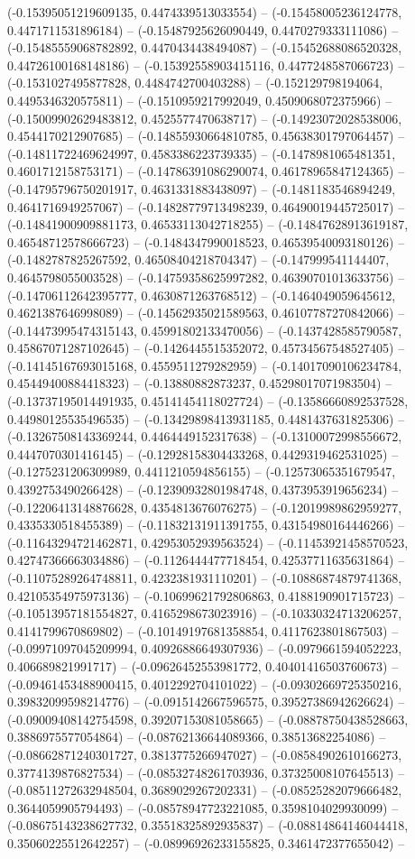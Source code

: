 (-0.15395051219609135, 0.4474339513033554) -- (-0.15458005236124778, 0.4471711531896184) -- (-0.15487925626090449, 0.4470279333111086) -- (-0.15485559068782892, 0.4470434438494087) -- (-0.15452688086520328, 0.44726100168148186) -- (-0.15392558903415116, 0.4477248587066723) -- (-0.1531027495877828, 0.4484742700403288) -- (-0.152129798194064, 0.4495346320575811) -- (-0.1510959217992049, 0.4509068072375966) -- (-0.15009902629483812, 0.4525577470638717) -- (-0.14923072028538006, 0.4544170212907685) -- (-0.14855930664810785, 0.45638301797064457) -- (-0.14811722469624997, 0.4583386223739335) -- (-0.1478981065481351, 0.4601712158753171) -- (-0.14786391086290074, 0.46178965847124365) -- (-0.14795796750201917, 0.4631331883438097) -- (-0.1481183546894249, 0.4641716949257067) -- (-0.14828779713498239, 0.46490019445725017) -- (-0.14841900909881173, 0.46533113042718255) -- (-0.14847628913619187, 0.46548712578666723) -- (-0.1484347990018523, 0.46539540093180126) -- (-0.1482787825267592, 0.46508404218704347) -- (-0.147999541144407, 0.4645798055003528) -- (-0.14759358625997282, 0.46390701013633756) -- (-0.14706112642395777, 0.4630871263768512) -- (-0.1464049059645612, 0.4621387646998089) -- (-0.14562935021589563, 0.46107787270842066) -- (-0.14473995474315143, 0.45991802133470056) -- (-0.1437428585790587, 0.45867071287102645) -- (-0.1426445515352072, 0.45734567548527405) -- (-0.14145167693015168, 0.4559511279282959) -- (-0.14017090106234784, 0.45449400884418323) -- (-0.13880882873237, 0.45298017071983504) -- (-0.13737195014491935, 0.45141454118027724) -- (-0.13586660892537528, 0.44980125535496535) -- (-0.13429898413931185, 0.4481437631825306) -- (-0.13267508143369244, 0.4464449152317638) -- (-0.13100072998556672, 0.4447070301416145) -- (-0.12928158304433268, 0.4429319462531025) -- (-0.1275231206309989, 0.4411210594856155) -- (-0.12573065351679547, 0.4392753490266428) -- (-0.12390932801984748, 0.4373953919656234) -- (-0.12206413148876628, 0.4354813676076275) -- (-0.12019989862959277, 0.4335330518455389) -- (-0.11832131911391755, 0.43154980164446266) -- (-0.11643294721462871, 0.42953052939563524) -- (-0.11453921458570523, 0.42747366663034886) -- (-0.1126444477718454, 0.42537711635631864) -- (-0.11075289264748811, 0.4232381931110201) -- (-0.10886874879741368, 0.42105354975973136) -- (-0.10699621792806863, 0.4188190901715723) -- (-0.10513957181554827, 0.4165298673023916) -- (-0.10330324713206257, 0.4141799670869802) -- (-0.10149197681358854, 0.4117623801867503) -- (-0.09971097045209994, 0.40926886649307936) -- (-0.0979661594052223, 0.406689821991717) -- (-0.09626452553981772, 0.40401416503760673) -- (-0.09461453488900415, 0.4012292704101022) -- (-0.09302669725350216, 0.39832099598214776) -- (-0.0915142667596575, 0.39527386942626624) -- (-0.09009408142754598, 0.39207153081058665) -- (-0.08878750438528663, 0.3886975577054864) -- (-0.08762136644089366, 0.38513682254086) -- (-0.08662871240301727, 0.3813775266947027) -- (-0.08584902610166273, 0.3774139876827534) -- (-0.08532748261703936, 0.37325008107645513) -- (-0.08511272632948504, 0.3689029267202331) -- (-0.08525282079666482, 0.3644059905794493) -- (-0.08578947723221085, 0.3598104029930099) -- (-0.08675143238627732, 0.35518325892935837) -- (-0.08814864146044418, 0.35060225512642257) -- (-0.08996926233155825, 0.3461472377655042) -- 